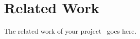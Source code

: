 \section{Related Work}
\label{sec:related_work}

The related work of your project~\cite{dijkstra_sosp1967} goes here.
